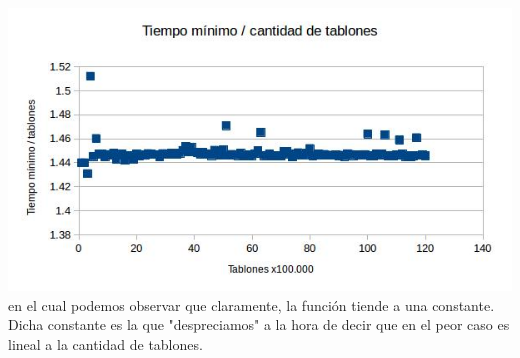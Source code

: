 \documentclass{article}
\begin{document}
\vspace{0.5cm}
\includegraphics[width=\textwidth,height=\textheight,keepaspectratio
]{puenteconstante.jpg}
en el cual podemos observar que claramente, la funci\'on tiende a una constante. Dicha constante es la que "despreciamos" a la hora de decir que en el peor caso es lineal a la cantidad de tablones.
\end{document}
